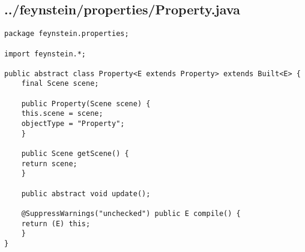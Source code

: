 \subsection*{../feynstein/properties/Property.java}
\begin{lstlisting}
package feynstein.properties;

import feynstein.*;

public abstract class Property<E extends Property> extends Built<E> {
    final Scene scene;
	
    public Property(Scene scene) {
	this.scene = scene;
	objectType = "Property";
    }
	
    public Scene getScene() {
	return scene;
    }
	
    public abstract void update();
	
    @SuppressWarnings("unchecked") public E compile() {
	return (E) this;
    }
}\end{lstlisting}

